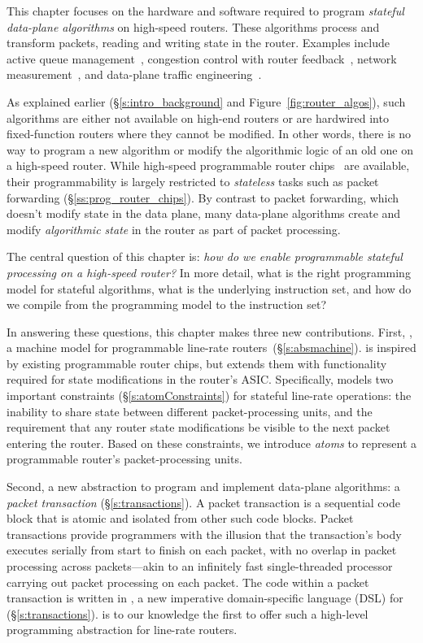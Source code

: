 This chapter focuses on the hardware and software required to program {\em
stateful data-plane algorithms} on high-speed routers. These algorithms process
and transform packets, reading and writing state in the router. Examples
include active queue management~\cite{red,avq,codel}, congestion control with
router feedback~\cite{xcp, rcp}, network measurement~\cite{opensketch,
bitmap_george}, and data-plane traffic engineering~\cite{conga, flowlet}.

As explained earlier (\S\ref{s:intro_background} and
Figure~\ref{fig:router_algos}), such algorithms are either not available on
high-end routers or are hardwired into fixed-function routers where they cannot
be modified. In other words, there is no way to program a new algorithm or
modify the algorithmic logic of an old one on a high-speed router. While
high-speed programmable router chips~\cite{flexpipe, xpliant} are available,
their programmability is largely restricted to {\em stateless} tasks such as
packet forwarding (\S\ref{ss:prog_router_chips}). By contrast to packet
forwarding, which doesn't modify state in the data plane, many data-plane
algorithms create and modify {\em algorithmic state} in the router as part of
packet processing.

The central question of this chapter is: {\em how do we enable programmable
stateful processing on a high-speed router?} In more detail, what is the right
programming model for stateful algorithms, what is the underlying instruction
set, and how do we compile from the programming model to the instruction set?

In answering these questions, this chapter makes three new contributions.
First, {\em \absmachine}, a machine model for programmable line-rate
routers~(\S\ref{s:absmachine}).  \absmachine is inspired by existing
programmable router chips, but extends them with functionality required for
state modifications in the router's ASIC.  Specifically, \absmachine models two
important constraints (\S\ref{s:atomConstraints}) for stateful line-rate
operations: the inability to share state between different packet-processing
units, and the requirement that any router state modifications be visible to
the next packet entering the router. Based on these constraints, we introduce
{\em atoms} to represent a programmable router's packet-processing units.

Second, a new abstraction to program and implement data-plane algorithms: a
{\em packet transaction} (\S\ref{s:transactions}). A packet transaction is a
sequential code block that is atomic and isolated from other such code blocks.
Packet transactions provide programmers with the illusion that the
transaction's body executes serially from start to finish on each packet, with
no overlap in packet processing across packets---akin to an infinitely fast
single-threaded processor carrying out packet processing on each packet. The
code within a packet transaction is written in {\em \pktlanguage{}}, a new
imperative domain-specific language (DSL) for (\S\ref{s:transactions}).
\pktlanguage is  to our knowledge the first to offer such a high-level
programming abstraction for line-rate routers.


